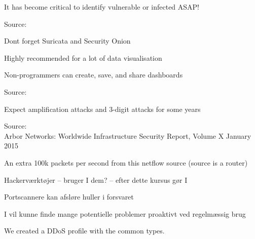 \documentclass[20pt,landscape,a4paper,footrule]{foils}
\begin{document}
\vskip 1cm

\centerline{It has become critical to identify vulnerable or infected ASAP!}

Source:
{\tiny{}}

Dont forget Suricata  and Security Onion\\ {\small{}}



\centerline{Highly recommended for a lot of data visualisation}

Non-programmers can create, save, and share dashboards

Source:





\centerline{Expect amplification attacks and 3-digit attacks for some years}

Source:\\
Arbor Networks: Worldwide Infrastructure Security Report, Volume X January 2015





\centerline{An extra 100k packets per second from this netflow source (source is a router)}

\begin{list1}
\item Hackerværktøjer -- bruger I dem? -- efter dette kursus gør I
\item Portscannere kan afsløre huller i forsvaret
\item I vil kunne finde mange potentielle problemer proaktivt ved
  regelmæssig brug

\end{list1}





We created a DDoS profile with the common types.
\end{document}
